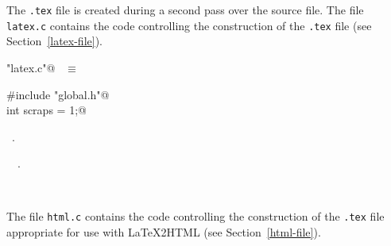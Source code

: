 \documentclass{report}
\begin{document}
The \verb|.tex| file is created during a second pass over the source
file. The file \verb|latex.c| contains the code controlling the
construction of the \verb|.tex| file 
(see Section~\ref{latex-file}).
\begin{flushleft} \small
\begin{minipage}{\linewidth} \label{scrap6}
\verb@"latex.c"@\nobreak\ {\footnotesize {} }$\equiv$
\vspace{-1ex}
\begin{list}{}{} \item
\mbox{}\verb@#include "global.h"@\\
\mbox{}\verb@static int scraps = 1;@\\
\mbox{}\verb@@{\NWsep}
\end{list}
\vspace{-1ex}
\footnotesize\addtolength{\baselineskip}{-1ex}
\begin{list}{}{\setlength{\itemsep}{-\parsep}\setlength{\itemindent}{-\leftmargin}}
\item \NWtxtFileDefBy\ .
\end{list}
\vspace{-2ex}
\footnotesize\addtolength{\baselineskip}{-1ex}
\begin{list}{}{\setlength{\itemsep}{-\parsep}\setlength{\itemindent}{-\leftmargin}}
\item \NWtxtIdentsUsed\nobreak\  \verb@scraps@\nobreak\ .\end{list}
\end{minipage}\\[4ex]
\end{flushleft}
The file \verb|html.c| contains the code controlling the
construction of the \verb|.tex| file appropriate for use with {\LaTeX}2HTML
(see Section~\ref{html-file}).
\end{document}

